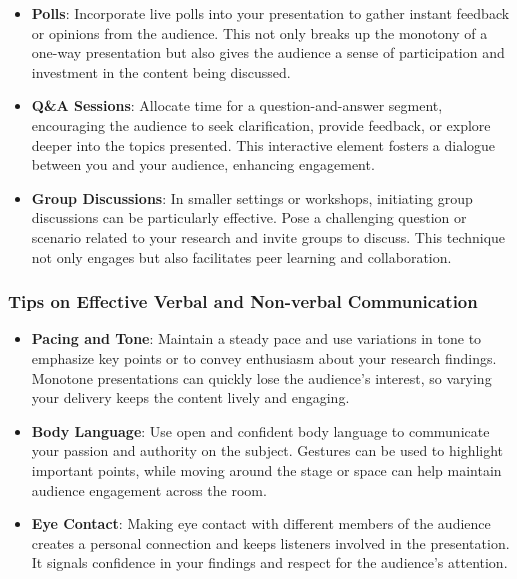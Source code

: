\documentclass[
]{book}
\begin{document}
\begin{itemize}
\item
  \textbf{Polls}: Incorporate live polls into your presentation to gather instant feedback or opinions from the audience. This not only breaks up the monotony of a one-way presentation but also gives the audience a sense of participation and investment in the content being discussed.
\item
  \textbf{Q\&A Sessions}: Allocate time for a question-and-answer segment, encouraging the audience to seek clarification, provide feedback, or explore deeper into the topics presented. This interactive element fosters a dialogue between you and your audience, enhancing engagement.
\item
  \textbf{Group Discussions}: In smaller settings or workshops, initiating group discussions can be particularly effective. Pose a challenging question or scenario related to your research and invite groups to discuss. This technique not only engages but also facilitates peer learning and collaboration.
\end{itemize}

\hypertarget{tips-on-effective-verbal-and-non-verbal-communication}{%
\subsubsection*{Tips on Effective Verbal and Non-verbal Communication}\label{tips-on-effective-verbal-and-non-verbal-communication}}

\begin{itemize}
\item
  \textbf{Pacing and Tone}: Maintain a steady pace and use variations in tone to emphasize key points or to convey enthusiasm about your research findings. Monotone presentations can quickly lose the audience's interest, so varying your delivery keeps the content lively and engaging.
\item
  \textbf{Body Language}: Use open and confident body language to communicate your passion and authority on the subject. Gestures can be used to highlight important points, while moving around the stage or space can help maintain audience engagement across the room.
\item
  \textbf{Eye Contact}: Making eye contact with different members of the audience creates a personal connection and keeps listeners involved in the presentation. It signals confidence in your findings and respect for the audience's attention.
\end{itemize}
\end{document}
